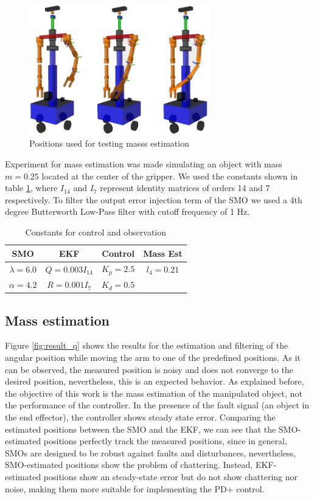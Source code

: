 \documentclass[a4paper, 10pt]{article}
\begin{document}
\begin{figure}[h!]
  \centering
  \includegraphics[width=0.7\textwidth]{Figures/test_poses.png}
  \caption{Positions used for testing masss estimation}
  \label{fig:test_poses}
\end{figure}

Experiment for mass estimation was made simulating an object with mass $m=0.25$ located at the center of the gripper. We used the constants shown in table \ref{tab:constants}, where $I_{14}$ and $I_7$ represent identity matrices of orders 14 and 7 respectively. To filter the output error injection term of the SMO we used a 4th degree Butterworth Low-Pass filter with cutoff frequency of 1 Hz. 
\begin{table}[h!]
  \centering
  \begin{tabular}{|c|c|c|c|}
    \hline
    SMO & EKF & Control & Mass Est\\
    \hline
    $\lambda=6.0$ & $Q = 0.003I_{14}$ & $K_p= 2.5$ & $l_4 = 0.21$\\
    $\alpha=4.2$ & $R = 0.001I_7$ & $K_d = 0.5$  & \\
    \hline
  \end{tabular}
  \caption{Constants for control and observation}
  \label{tab:constants}
\end{table}

\subsection{Mass estimation}
Figure \ref{fig:result_q} shows the results for the estimation and filtering of the angular position while moving the arm to one of the predefined positions. As it can be observed, the measured position is noisy and does not converge to the desired position, nevertheless, this is an expected behavior. As explained before, the objective of this work is the mass estimation of the manipulated object, not the performance of the controller. In the presence of the fault signal (an object in the end effector), the controller shows steady state error. Comparing the estimated positions between the SMO and the EKF, we can see that the SMO-estimated positions perfectly track the measured positions, since in general, SMOs are designed to be robust against faults and disturbances, nevertheless, SMO-estimated positions show the problem of chattering. Instead, EKF-estimated positions show an steady-state error but do not show chattering nor noise, making them more suitable for implementing the PD+ control. 
\end{document}
